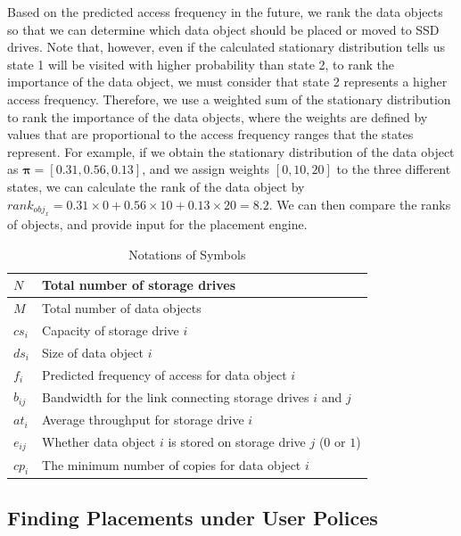 Based on the predicted access frequency in the future, we rank the data objects  so that we can determine which data object should be placed or moved to SSD drives. Note that, however, even if the calculated stationary distribution tells us state 1 will be visited with higher probability than state 2, to rank the importance of the data object, we must consider that state 2 represents a higher access frequency. Therefore, we use a weighted sum of the stationary distribution to rank the importance of the data objects, where the weights are defined by values that are proportional to the access frequency ranges that the states represent. For example, if we obtain the stationary distribution of the data object as $\boldsymbol{\pi} = [0.31, 0.56, 0.13]$, and we assign weights $[0, 10, 20]$ to the three different states, we can calculate the rank of the data object by $rank_{obj_{x}} = 0.31\times0+0.56\times10+0.13\times20 = 8.2$. We can then compare the ranks of objects, and provide input for the placement engine.

\begin{table}[t]
\centering
\scriptsize
\begin{tabular}{|l|l|}
\hline
 $N$ & Total number of storage drives \\
 \hline
 $M$ & Total number of data objects  \\
 \hline
 $cs_i$ & Capacity of storage drive $i$ \\
 \hline
 $ds_i$ & Size of data object $i$\\
 \hline
 $f_i$ & Predicted frequency of access for data object $i$\\
 \hline
 $b_{ij}$ & Bandwidth for the link connecting storage drives $i$ and $j$\\
 \hline
 $at_i$ & Average throughput for storage drive $i$\\
 \hline
 $e_{ij}$ & Whether data object $i$ is stored on storage drive $j$ ($0$ or $1$)\\
 \hline
 $cp_i$ & The minimum number of copies for data object $i$\\
 \hline
\end{tabular}
\normalsize
\caption{Notations of Symbols}
\vspace{-0.3in}
\label{tablenotes}
\end{table}


\subsection{Finding Placements under User Polices}

